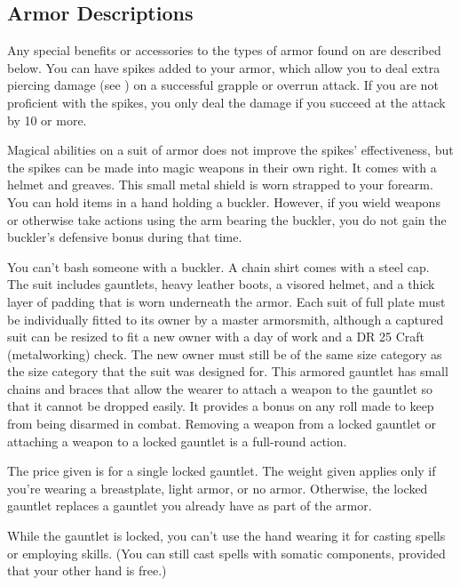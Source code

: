     \subsection{Armor Descriptions}
        Any special benefits or accessories to the types of armor found on  are described below.
         You can have spikes added to your armor, which allow you to deal extra piercing damage (see ) on a successful grapple or overrun attack. If you are not proficient with the spikes, you only deal the damage if you succeed at the attack by 10 or more.
        \par Magical abilities on a suit of armor does not improve the spikes' effectiveness, but the spikes can be made into magic weapons in their own right.
         It comes with a helmet and greaves.
         This small metal shield is worn strapped to your forearm.
        You can hold items in a hand holding a buckler.
        However, if you wield weapons or otherwise take actions using the arm bearing the buckler, you do not gain the buckler's defensive bonus during that time.
        \par You can't bash someone with a buckler.
         A chain shirt comes with a steel cap.
         The suit includes gauntlets, heavy leather boots, a visored helmet, and a thick layer of padding that is worn underneath the armor. Each suit of full plate must be individually fitted to its owner by a master armorsmith, although a captured suit can be resized to fit a new owner with a day of work and a DR 25 Craft (metalworking) check. The new owner must still be of the same size category as the size category that the suit was designed for.
         This armored gauntlet has small chains and braces that allow the wearer to attach a weapon to the gauntlet so that it cannot be dropped easily. It provides a  bonus on any roll made to keep from being disarmed in combat. Removing a weapon from a locked gauntlet or attaching a weapon to a locked gauntlet is a full-round action.
        \par The price given is for a single locked gauntlet. The weight given applies only if you're wearing a breastplate, light armor, or no armor. Otherwise, the locked gauntlet replaces a gauntlet you already have as part of the armor.
        \par While the gauntlet is locked, you can't use the hand wearing it for casting spells or employing skills. (You can still cast spells with somatic components, provided that your other hand is free.)
